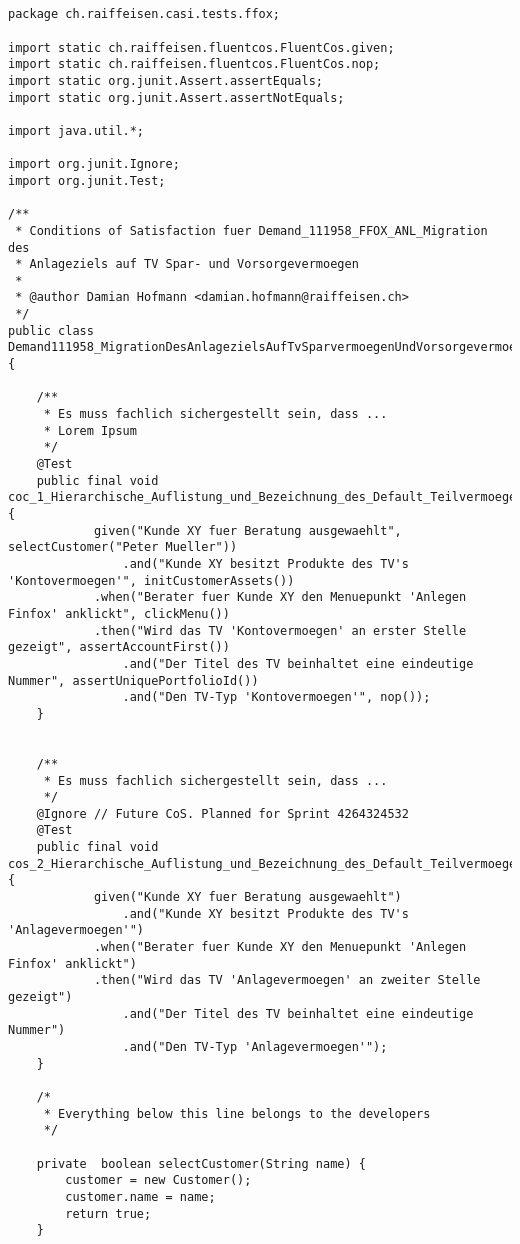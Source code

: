 \begin{lstlisting}[caption=Demand111958\_MigrationDesAnlagezielsAufTvSparvermoegenUndVorsorgevermoegen.java, label=code:fluent_demand]


package ch.raiffeisen.casi.tests.ffox;

import static ch.raiffeisen.fluentcos.FluentCos.given;
import static ch.raiffeisen.fluentcos.FluentCos.nop;
import static org.junit.Assert.assertEquals;
import static org.junit.Assert.assertNotEquals;

import java.util.*;

import org.junit.Ignore;
import org.junit.Test;

/**
 * Conditions of Satisfaction fuer Demand_111958_FFOX_ANL_Migration des
 * Anlageziels auf TV Spar- und Vorsorgevermoegen
 * 
 * @author Damian Hofmann <damian.hofmann@raiffeisen.ch>
 */
public class Demand111958_MigrationDesAnlagezielsAufTvSparvermoegenUndVorsorgevermoegen {

	/**
	 * Es muss fachlich sichergestellt sein, dass ...
	 * Lorem Ipsum
	 */
	@Test
	public final void coc_1_Hierarchische_Auflistung_und_Bezeichnung_des_Default_Teilvermoegens_Kontovermoegen() {
			given("Kunde XY fuer Beratung ausgewaehlt", selectCustomer("Peter Mueller"))
				.and("Kunde XY besitzt Produkte des TV's 'Kontovermoegen'", initCustomerAssets())
			.when("Berater fuer Kunde XY den Menuepunkt 'Anlegen Finfox' anklickt", clickMenu())
			.then("Wird das TV 'Kontovermoegen' an erster Stelle gezeigt", assertAccountFirst())
				.and("Der Titel des TV beinhaltet eine eindeutige Nummer", assertUniquePortfolioId())
				.and("Den TV-Typ 'Kontovermoegen'", nop());
	}
		
	
	/**
	 * Es muss fachlich sichergestellt sein, dass ...
	 */
	@Ignore // Future CoS. Planned for Sprint 4264324532
	@Test
	public final void cos_2_Hierarchische_Auflistung_und_Bezeichnung_des_Default_Teilvermoegens_Anlagevermoegen() {
			given("Kunde XY fuer Beratung ausgewaehlt")
				.and("Kunde XY besitzt Produkte des TV's 'Anlagevermoegen'")
			.when("Berater fuer Kunde XY den Menuepunkt 'Anlegen Finfox' anklickt")
			.then("Wird das TV 'Anlagevermoegen' an zweiter Stelle gezeigt")
				.and("Der Titel des TV beinhaltet eine eindeutige Nummer")
				.and("Den TV-Typ 'Anlagevermoegen'");
	}
	
	/*
	 * Everything below this line belongs to the developers
	 */
	
	private  boolean selectCustomer(String name) {
		customer = new Customer();
		customer.name = name;
		return true;
	}


\end{lstlisting}
